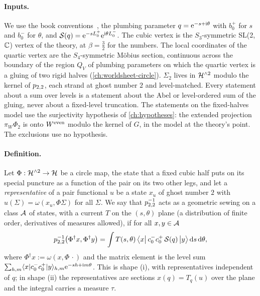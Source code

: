 \paragraph{Inputs.}
We use the book conventions~\cite{Erbin:2021:StringFieldTheory}, the plumbing parameter $q = \mathrm{e}^{- s + \mathrm{i} \theta}$ with $b_0^+$ for $s$ and $b_0^-$ for $\theta$, and ${\mathcal{S}}(q) = \mathrm{e}^{- s L_0^+} \mathrm{e}^{\mathrm{i} \theta L_0^-}$.
The cubic vertex is the $S_3$-symmetric SL(2,$\mathbb{C}$) vertex of the theory, at $\beta = \tfrac32$ for the numbers.
The local coordinates of the quartic vertex are the $S_4$-symmetric Möbius section, continuous across the boundary of the region $Q_V$ of plumbing parameters on which the quartic vertex is a gluing of two rigid halves (\cref{ch:worldsheet-circle}).
$\Sigma_2$ lives in $\mathcal{H}^{\wedge 2}$ modulo the kernel of $p_{2,2}$, each strand at ghost number $2$ and level-matched.
Every statement about a sum over levels is a statement about the Abel or level-ordered sum of the gluing, never about a fixed-level truncation.
The statements on the fixed-halves model use the surjectivity hypothesis of \cref{ch:hypotheses}: the extended projection $\pi_W \Phi_2$ is onto $W^{\rm even}$ modulo the kernel of $G$, in the model at the theory's point.
The exclusions use no hypothesis.

\paragraph{Definition.}
Let $\Phi : \mathcal{H}^{\wedge 2} \to \mathcal{H}$ be a circle map, the state that a fixed cubic half puts on its special puncture as a function of the pair on its two other legs, and let a \emph{representative} of a pair functional $u$ be a state $x_u$ of ghost number $2$ with $u(\Sigma) = \omega(x_u, \Phi \Sigma)$ for all $\Sigma$.
We say that $p_{2,2}^{-1}$ acts as a geometric sewing on a class ${\mathcal{A}}$ of states, with a current $T$ on the $(s, \theta)$ plane (a distribution of finite order, derivatives of measures allowed), if for all $x, y \in {\mathcal{A}}$
\begin{equation}
  \label{eq:ch9:sewing-form}
  p_{2,2}^{-1} \big( \Phi^\dagger x, \Phi^\dagger y \big)
    = \int T(s, \theta) \, \big\langle x \big| \, c_0^- c_0^+ \, {\mathcal{S}}(q) \, \big| y \big\rangle \, \mathrm{d} s \, \mathrm{d} \theta,
\end{equation}
where $\Phi^\dagger x := \omega(x, \Phi \, \cdot)$ and the matrix element is the level sum $\sum_{h, m} \langle x | c_0^- c_0^+ | y \rangle_{h, m} \mathrm{e}^{- s h + \mathrm{i} m \theta}$.
This is shape (i), with representatives independent of $q$; in shape (ii) the representatives are sections $x(q) = T_q(u)$ over the plane and the integral carries a measure $\tau$.

